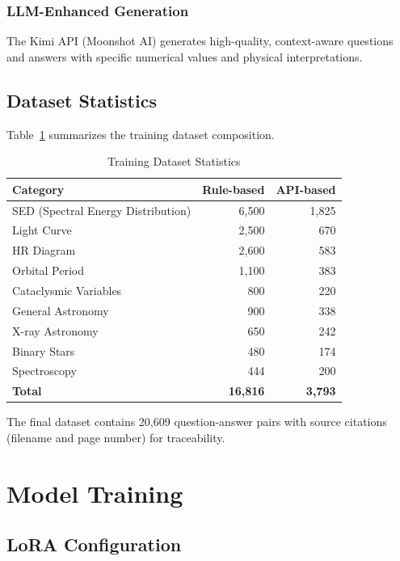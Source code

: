 \documentclass[11pt,a4paper]{article}
\begin{document}
\subsubsection{LLM-Enhanced Generation}

The Kimi API (Moonshot AI) generates high-quality, context-aware questions and answers with specific numerical values and physical interpretations.

\subsection{Dataset Statistics}

Table~\ref{tab:dataset} summarizes the training dataset composition.

\begin{table}[htbp]
\centering
\caption{Training Dataset Statistics}
\label{tab:dataset}
\begin{tabular}{lrr}
\toprule
\textbf{Category} & \textbf{Rule-based} & \textbf{API-based} \\
\midrule
SED (Spectral Energy Distribution) & 6,500 & 1,825 \\
Light Curve & 2,500 & 670 \\
HR Diagram & 2,600 & 583 \\
Orbital Period & 1,100 & 383 \\
Cataclysmic Variables & 800 & 220 \\
General Astronomy & 900 & 338 \\
X-ray Astronomy & 650 & 242 \\
Binary Stars & 480 & 174 \\
Spectroscopy & 444 & 200 \\
\midrule
\textbf{Total} & \textbf{16,816} & \textbf{3,793} \\
\bottomrule
\end{tabular}
\end{table}

The final dataset contains 20,609 question-answer pairs with source citations (filename and page number) for traceability.

\section{Model Training}\label{sec:training}

\subsection{LoRA Configuration}
\end{document}
